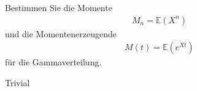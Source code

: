 \begin{exercise}
Bestimmen Sie die Momente
\begin{align*}
  M_n = \mathbb{E}(X^n)
\end{align*}
und die Momentenerzeugende
\begin{align*}
  M(t) = \mathbb{E}(e^{Xt})
\end{align*}
für die Gammaverteilung.
\end{exercise}
\begin{solution}

Trivial

\end{solution}
